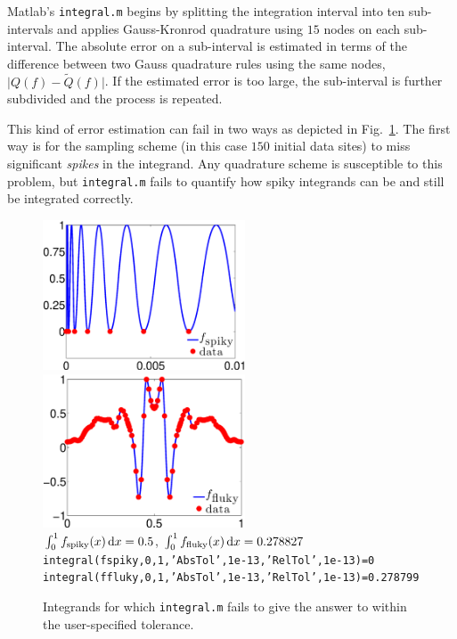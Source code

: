 \documentclass[11pt]{NSFamsart}
\newcommand{\tQ}{\widetilde{Q}}
\def\dif{\textup{d}}
\newcommand{\Matlab}{{\sc Matlab}\xspace}
\begin{document}
\Matlab's {\tt integral.m} begins by splitting the integration interval into ten sub-intervals and applies Gauss-Kronrod quadrature using $15$ nodes on each sub-interval.  The absolute error on a sub-interval is estimated in terms of the difference between two Gauss quadrature rules using the same nodes, $\bigl \lvert Q(f)-\tQ(f) \bigr \rvert$. If the estimated error is too large, the sub-interval is further subdivided and the process is repeated.

This kind of error estimation can fail in two ways as depicted in Fig.\ \ref{MatIntegFailFig}. The first way is for the sampling scheme (in this case $150$ initial data sites) to miss significant \emph{spikes} in the integrand.  Any quadrature scheme is susceptible to this problem, but {\tt integral.m} fails to quantify how spiky integrands can be and still be integrated correctly.

\begin{figure}[h]
\centering
\includegraphics[width=6cm]{SpikyFoolIntegral.eps} \qquad
\includegraphics[width=6cm]{FlukyFoolIntegral.eps} \\
$\int_0^1 f_{\text{spiky}}(x) \, \dif x=0.5$, \qquad \qquad $\int_0^1 f_{\text{fluky}}(x) \, \dif x=0.278827$ \\
{\tt integral(fspiky,0,1,'AbsTol',1e-13,'RelTol',1e-13)=0} \\
{\tt integral(ffluky,0,1,'AbsTol',1e-13,'RelTol',1e-13)=0.278799}
\caption{Integrands for which {\tt integral.m} fails to give the answer to within the user-specified tolerance. \label{MatIntegFailFig}}
\end{figure}
\end{document}
